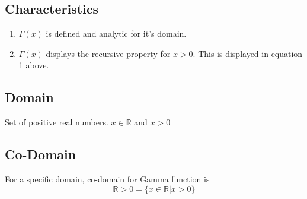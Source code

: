 \documentclass[12pt]{report}
\begin{document}
\subsection{Characteristics}
\begin{enumerate}
    \item $\Gamma(x)$ is defined and analytic for it's domain.
    \item $\Gamma(x)$ displays the recursive property for $x>0$. This is displayed in equation 1 above.
\end{enumerate}


\subsection{Domain}
Set of positive real numbers.
$x\in\mathbb{R}$ and  $x>0$
\subsection{Co-Domain}
For a specific domain, co-domain for Gamma function is
\begin{displaymath}
    \mathbb{R}>0 = \{x\in\mathbb{R}|x>0\}
\end{displaymath}
\end{document}
